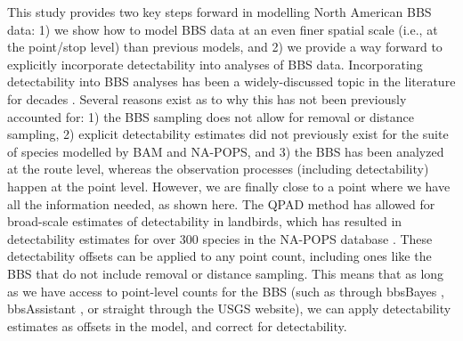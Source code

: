 \documentclass[12pt]{article}
\begin{document}
\par This study provides two key steps forward in modelling North American BBS data: 1) we show how to model BBS data at an even finer spatial scale (i.e., at the point/stop level) than previous models, and 2) we provide a way forward to explicitly incorporate detectability into analyses of BBS data.
Incorporating detectability into BBS analyses has been a widely-discussed topic in the literature for decades \citep{sauer_observer_1994, ankorikarlinsky_north_2022, zhang_habitat_2021, somershoe_combining_2006, griffith_traffic_2010, binley_better_2023, knight_combination_2021}.
Several reasons exist as to why this has not been previously accounted for: 1) the BBS sampling does not allow for removal or distance sampling, 2) explicit detectability estimates did not previously exist for the suite of species modelled by BAM and NA-POPS, and 3) the BBS has been analyzed at the route level, whereas the observation processes (including detectability) happen at the point level.
However, we are finally close to a point where we have all the information needed, as shown here.
The QPAD method \citep{solymos_calibrating_2013} has allowed for broad-scale estimates of detectability in landbirds, which has resulted in detectability estimates for over 300 species in the NA-POPS database \citep{edwards_point_2023}.
These detectability offsets can be applied to any point count, including ones like the BBS that do not include removal or distance sampling.
This means that as long as we have access to point-level counts for the BBS (such as through bbsBayes \citep{edwards_bbsbayes_2021}, bbsAssistant \citep{burnett_bbsassistant_2019}, or straight through the USGS website), we can apply detectability estimates as offsets in the model, and correct for detectability.
\end{document}
